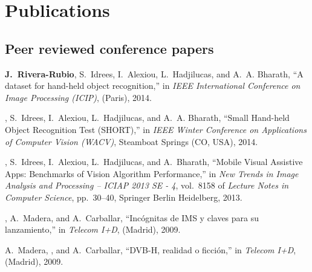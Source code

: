 
\section{Publications}

\subsection{Peer reviewed conference papers}

\begin{thebibliography}{3}

\textbf{J.~Rivera-Rubio}, S.~Idrees, I.~Alexiou, L.~Hadjilucas, and A.~A. Bharath, ``{A
  dataset for hand-held object recognition},'' in {\em IEEE International
  Conference on Image Processing (ICIP)}, (Paris), 2014.

, S.~Idrees, I.~Alexiou, L.~Hadjilucas, and A.~A. Bharath,
  ``{Small Hand-held Object Recognition Test (SHORT)},'' in {\em IEEE Winter
  Conference on Applications of Computer Vision (WACV)}, Steamboat Springs
  (CO, USA), 2014.

, S.~Idrees, I.~Alexiou, L.~Hadjilucas, and A.~Bharath,
  ``{Mobile Visual Assistive Apps: Benchmarks of Vision Algorithm
  Performance},'' in {\em New Trends in Image Analysis and Processing -- ICIAP
  2013 SE - 4}, vol.~8158 of {\em Lecture Notes in Computer Science},
  pp.~30--40, Springer Berlin Heidelberg, 2013.

, A.~Madera, and A.~Carballar, ``{Inc\'{o}gnitas de IMS y claves
  para su lanzamiento},'' in {\em Telecom I+D}, (Madrid), 2009.

A.~Madera, , and A.~Carballar, ``{DVB-H, realidad o
  ficci\'{o}n},'' in {\em Telecom I+D}, (Madrid), 2009.
  
\end{thebibliography}

